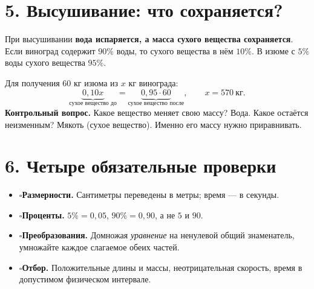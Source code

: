 \documentclass[a4paper,12pt]{article}
\newcommand{\checkitem}{\(\square\)\enspace}
\newcommand{\important}[1]{\textcolor{deepaccent}{\textbf{#1}}}
\newcommand{\method}[1]{\medskip\noindent\textcolor{deepaccent}{\textbf{#1}}\quad}
\newcommand{\sectiontitle}[1]{\needspace{6\baselineskip}\section*{\color{deepaccent}#1}}
\begin{document}
\sectiontitle{5. Высушивание: что сохраняется?}
При высушивании \important{вода испаряется, а масса сухого вещества сохраняется}. Если виноград содержит \(90\%\) воды, то сухого вещества в нём \(10\%\). В изюме с \(5\%\) воды сухого вещества \(95\%\).

Для получения \(60\) кг изюма из \(x\) кг винограда:
\[
\underbrace{0{,}10x}_{\text{сухое вещество до}}
=\underbrace{0{,}95\cdot60}_{\text{сухое вещество после}},
\qquad x=\boxed{570\ \text{кг}}.
\]
\method{Контрольный вопрос.} Какое вещество меняет свою массу? Вода. Какое остаётся неизменным? Мякоть (сухое вещество). Именно его массу нужно приравнивать.

\sectiontitle{6. Четыре обязательные проверки}
\begin{itemize}
\item \checkitem \textbf{Размерности.} Сантиметры переведены в метры; время --- в секунды.
\item \checkitem \textbf{Проценты.} \(5\%=0{,}05\), \(90\%=0{,}90\), а не \(5\) и \(90\).
\item \checkitem \textbf{Преобразования.} Домножая \emph{уравнение} на ненулевой общий знаменатель, умножайте каждое слагаемое обеих частей.
\item \checkitem \textbf{Отбор.} Положительные длины и массы, неотрицательная скорость, время в допустимом физическом интервале.
\end{itemize}
\end{document}
